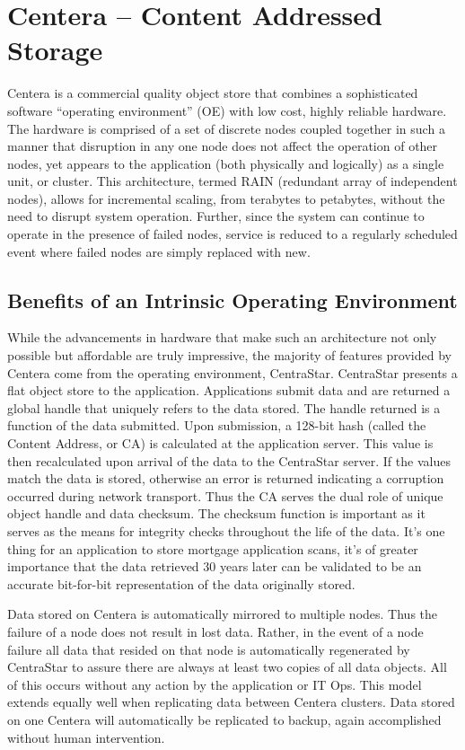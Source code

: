 \section{Centera -- Content Addressed Storage}

Centera is a commercial quality object store that combines a
sophisticated software ``operating environment'' (OE) with low cost,
highly reliable hardware. The hardware is comprised of a set of discrete
nodes coupled together in such a manner that disruption in any one node
does not affect the operation of other nodes, yet appears to the
application (both physically and logically) as a single unit, or
cluster. This architecture, termed RAIN (redundant array of independent
nodes), allows for incremental scaling, from terabytes to petabytes,
without the need to disrupt system operation. Further, since the system
can continue to operate in the presence of failed nodes, service is
reduced to a regularly scheduled event where failed nodes are simply
replaced with new.

\subsection{Benefits of an Intrinsic Operating
Environment}

While the advancements in hardware that make such an architecture not
only possible but affordable are truly impressive, the majority of
features provided by Centera come from the operating environment,
CentraStar. CentraStar presents a flat object store to the application.
Applications submit data and are returned a global handle that uniquely
refers to the data stored. The handle returned is a function of the data
submitted. Upon submission, a 128-bit hash (called the Content Address,
or CA) is calculated at the application server. This value is then
recalculated upon arrival of the data to the CentraStar server. If the
values match the data is stored, otherwise an error is returned
indicating a corruption occurred during network transport. Thus the CA
serves the dual role of unique object handle and data checksum. The
checksum function is important as it serves as the means for integrity
checks throughout the life of the data. It's one thing for an
application to store mortgage application scans, it's of greater
importance that the data retrieved 30 years later can be validated to be
an accurate bit-for-bit representation of the data originally stored.

Data stored on Centera is automatically mirrored to multiple nodes. Thus
the failure of a node does not result in lost data. Rather, in the event
of a node failure all data that resided on that node is automatically
regenerated by CentraStar to assure there are always at least two copies
of all data objects. All of this occurs without any action by the
application or IT Ops. This model extends equally well when replicating
data between Centera clusters. Data stored on one Centera will
automatically be replicated to backup, again accomplished without human
intervention.

